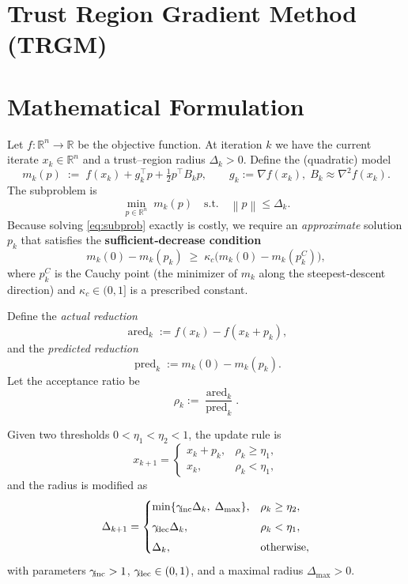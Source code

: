 \documentclass{article}
\newcommand{\norm}[1]{\left\lVert #1\right\rVert}
\newcommand{\R}{\mathbb{R}}
\begin{document}
\section*{Trust Region Gradient Method (TRGM)}

\section*{Mathematical Formulation}
Let $f:\R^{n}\rightarrow\R$ be the objective function.  
At iteration $k$ we have the current iterate $x_{k}\in\R^{n}$ and a trust–region radius $\Delta_{k}>0$.
Define the (quadratic) model
\[
m_{k}(p)\;:=\;f(x_{k})+g_{k}^{\top}p+\tfrac12 p^{\top}B_{k}p,
\qquad 
g_{k}:=\nabla f(x_{k}),\; B_{k}\approx \nabla^{2}f(x_{k}).
\]
The subproblem is
\begin{equation}
\label{eq:subprob}
\min_{p\in\R^{n}}\; m_{k}(p)\quad\text{s.t.}\quad \norm{p}\le \Delta_{k}.
\end{equation}
Because solving \eqref{eq:subprob} exactly is costly, we require an \emph{approximate} solution $p_{k}$ that satisfies the \textbf{sufficient‑decrease condition}
\begin{equation}
\label{eq:suffdec}
m_{k}(0)-m_{k}(p_{k})\;\ge\;\kappa_{\!c}\bigl(m_{k}(0)-m_{k}(p^{C}_{k})\bigr),
\end{equation}
where $p^{C}_{k}$ is the Cauchy point (the minimizer of $m_{k}$ along the steepest‑descent direction) and $\kappa_{\!c}\in(0,1]$ is a prescribed constant.

Define the \emph{actual reduction}
\[
\operatorname{ared}_{k}:=f(x_{k})-f(x_{k}+p_{k}),
\]
and the \emph{predicted reduction}
\[
\operatorname{pred}_{k}:=m_{k}(0)-m_{k}(p_{k}).
\]
Let the acceptance ratio be
\[
\rho_{k}:=\frac{\operatorname{ared}_{k}}{\operatorname{pred}_{k}}.
\]

Given two thresholds $0<\eta_{1}<\eta_{2}<1$, the update rule is
\[
x_{k+1}= 
\begin{cases}
x_{k}+p_{k}, & \rho_{k}\ge \eta_{1},\\[4pt]
x_{k},      & \rho_{k}<\eta_{1},
\end{cases}
\]
and the radius is modified as
\[
\Delta_{k+1}= 
\begin{cases}
\min\{\gamma_{\!{\rm inc}}\Delta_{k},\;\Delta_{\max}\}, & \rho_{k}\ge \eta_{2},\\[4pt]
\gamma_{\!{\rm dec}}\Delta_{k},                     & \rho_{k}<\eta_{1},\\[4pt]
\Delta_{k},                                         & \text{otherwise},
\end{cases}
\]
with parameters $\gamma_{\!{\rm inc}}>1$, $\gamma_{\!{\rm dec}}\in(0,1)$, and a maximal radius $\Delta_{\max}>0$.
\end{document}
